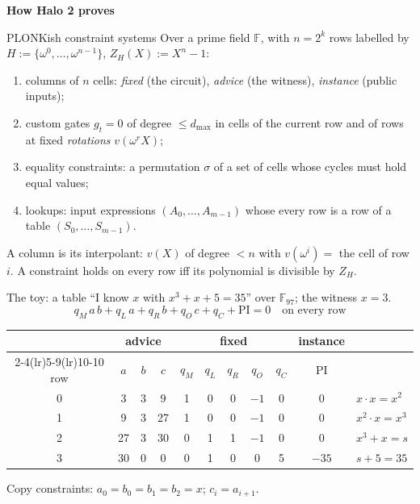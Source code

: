 \documentclass[aspectratio=169,11pt]{beamer}
\newcommand{\F}{\mathbb{F}}
\newcommand{\divider}[1]{\begin{frame}[plain]\vfill\centering
  {\usebeamercolor[fg]{structure}\Huge\bfseries #1}\vfill\end{frame}}
\newcommand{\ZH}{Z_H}
\begin{document}
\divider{How Halo 2 proves}

\begin{frame}{PLONKish constraint systems}
\small
Over a prime field $\F$, with $n = 2^k$ rows labelled by
$H := \{\omega^0, \dots, \omega^{n-1}\}$, $\ZH(X) := X^n - 1$:
\begin{enumerate}\itemsep4pt
\item columns of $n$ cells: \emph{fixed} (the circuit), \emph{advice} (the
  witness), \emph{instance} (public inputs);
\item custom gates $g_t = 0$ of degree $\le d_{\max}$ in cells of the current
  row and of rows at fixed \emph{rotations} $v(\omega^r X)$;
\item equality constraints: a permutation $\sigma$ of a set of cells whose
  cycles must hold equal values;
\item lookups: input expressions $(A_0, \dots, A_{m-1})$ whose every row is a
  row of a table $(S_0, \dots, S_{m-1})$.
\end{enumerate}
\vfill
A column is its interpolant: $v(X)$ of degree $< n$ with $v(\omega^i) =$ the
cell of row $i$. A constraint holds on every row iff its polynomial is
divisible by $\ZH$.
\end{frame}

\begin{frame}{The toy: a table}
``I know $x$ with $x^3 + x + 5 = 35$'' over $\F_{97}$; the witness $x = 3$.
\[
q_M\, a\, b + q_L\, a + q_R\, b + q_O\, c + q_C + \mathrm{PI} = 0
\quad\text{on every row}
\]
\begin{center}\small
\begin{tabular}{@{}c ccc ccccc c l@{}}
\toprule
& \multicolumn{3}{c}{advice} & \multicolumn{5}{c}{fixed} & instance & \\
\cmidrule(lr){2-4}\cmidrule(lr){5-9}\cmidrule(lr){10-10}
row & $a$ & $b$ & $c$ & $q_M$ & $q_L$ & $q_R$ & $q_O$ & $q_C$
  & $\mathrm{PI}$ & \\
\midrule
0 & 3 & 3 & 9 & 1 & 0 & 0 & $-1$ & 0 & 0 & $x \cdot x = x^2$ \\
1 & 9 & 3 & 27 & 1 & 0 & 0 & $-1$ & 0 & 0 & $x^2 \cdot x = x^3$ \\
2 & 27 & 3 & 30 & 0 & 1 & 1 & $-1$ & 0 & 0 & $x^3 + x = s$ \\
3 & 30 & 0 & 0 & 0 & 1 & 0 & 0 & 5 & $-35$ & $s + 5 = 35$ \\
\bottomrule
\end{tabular}
\end{center}
Copy constraints: $a_0 = b_0 = b_1 = b_2 = x$; $c_i = a_{i+1}$.
\end{frame}
\end{document}
